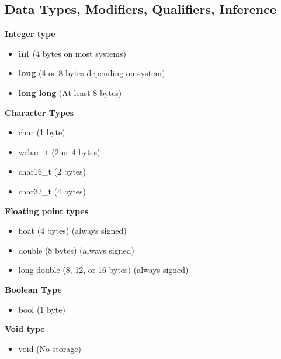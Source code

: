 \documentclass{report}
\begin{document}
    \subsection{Data Types, Modifiers, Qualifiers, Inference}
    \begin{minipage}[t]{0.47\textwidth}
    \textbf{Integer type}
    \begin{itemize}
        \item \textbf{int} (4 bytes on most systems)
        \item \textbf{long} (4 or 8 bytes depending on system)
        \item \textbf{long long} (At least 8 bytes)
    \end{itemize}
\end{minipage}
\begin{minipage}[t]{0.47\textwidth}
    \textbf{Character Types}
    \begin{itemize}
        \item char (1 byte)
        \item wchar\_t (2 or 4 bytes)
        \item char16\_t (2 bytes)
        \item char32\_t (4 bytes)
    \end{itemize}
\end{minipage}
\bigbreak \noindent 
\begin{minipage}[t]{0.47\textwidth}
    \textbf{Floating point types}
    \begin{itemize}
        \item float (4 bytes) (always signed)
        \item double (8 bytes) (always signed)
        \item long double (8, 12, or 16 bytes) (always signed)
    \end{itemize}
\end{minipage}
\begin{minipage}[t]{0.47\textwidth}
    \textbf{Boolean Type}
    \begin{itemize}
        \item bool (1 byte)
    \end{itemize}
\end{minipage}
\bigbreak \noindent \bigbreak \noindent 
\begin{minipage}{0.47\textwidth}
    \textbf{Void type}
    \begin{itemize}
        \item void (No storage)
    \end{itemize}
\end{minipage}
\end{document}
